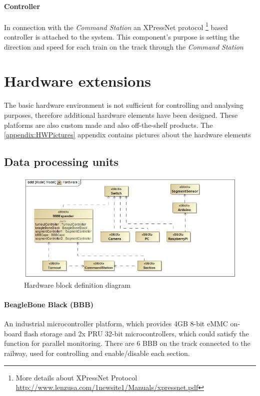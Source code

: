 \paragraph{Controller}
In connection with the \textit{Command Station} an XPressNet protocol \footnote{More details about XPressNet Protocol \url{http://www.lenzusa.com/1newsite1/Manuals/xpressnet.pdf}} based controller is attached to the system. This component's purpose is setting the direction and speed for each train on the track through the \textit{Command Station}

\section{Hardware extensions}
The basic hardware environment is not sufficient for controlling and analysing purposes, therefore additional hardware elements have been designed. These platforms are also custom made and also off-the-shelf products. 
The \ref{appendix:HWPictures} appendix contains pictures about the hardware elements
\subsection{Data processing units}

\begin{figure}[h]
	\centering
	\includegraphics[width=150mm]{figures/modes3/Hardware.png}
	\caption{Hardware block definition diagram}
	\label{fig:Modes3HWBDD}
\end{figure}
\paragraph{BeagleBone Black (BBB)}
An industrial microcontroller platform, which provides 4GB 8-bit eMMC on-board flash storage and 2x PRU 32-bit microcontrollers, which could satisfy the function for parallel monitoring. There are 6 BBB on the track connected to the railway, used for controlling and enable/disable each section.
